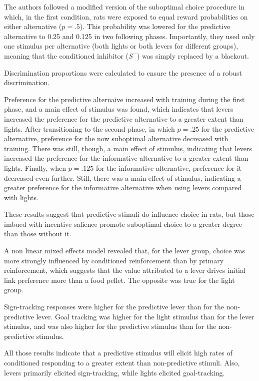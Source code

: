 \documentclass[a4paper,12pt]{article}
\begin{document}
The authors followed a modified version of the suboptimal choice procedure in which, in the first condition, rats were exposed to equal reward probabilities on either alternative ($p={.}5$). This probability was lowered for the predictive alternative to 0.25 and 0.125 in two following phases. Importantly, they used only one stimulus per alternative (both lights or both levers for different groups), meaning that the conditioned inhibitor ($S^-$) was simply replaced by a blackout.

Discrimination proportions were calculated to ensure the presence of a robust discrimination.

Preference for the predictive alternaive increased with training during the first phase, and a main effect of stimulus was found, which indicates that levers increased the preference for the predictive alternative to a greater extent than lights. After transitioning to the second phase, in which $p={.}25$ for the predictive alternative, preference for the now suboptimal alternative decreased with training. There was still, though, a main effect of stimulus, indicating that levers increased the preference for the informative alternative to a greater extent than lights. Finally, when $p={.}125$ for the informative alternative, preference for it decreased even further. Still, there was a main effect of stimulus, indicating a greater preference for the informative alternative when using levers compared with lights.

These results suggest that predictive stimuli do influence choice in rats, but those imbued with incentive salience promote suboptimal choice  to a greater degree than those without it.

A non linear mixed effects model revealed that, for the lever group, choice was more strongly influenced by conditioned reinforcement than by primary reinforcement, which suggests that the value attributed to a lever drives initial link preference more than a food pellet. The opposite was true for the light group.

Sign-tracking responses were higher for the predictive lever than for the non-predictive lever. Goal tracking was higher for the light stimulus than for the lever stimulus, and was also higher for the predictive stimulus than for the non-predictive stimulus.

All those results indicate that a predictive stimulus will elicit high rates of conditioned responding to a greater extent than non-predictive stimuli. Also, levers primarily elicited sign-tracking, while lights elicited goal-tracking.
\end{document}
